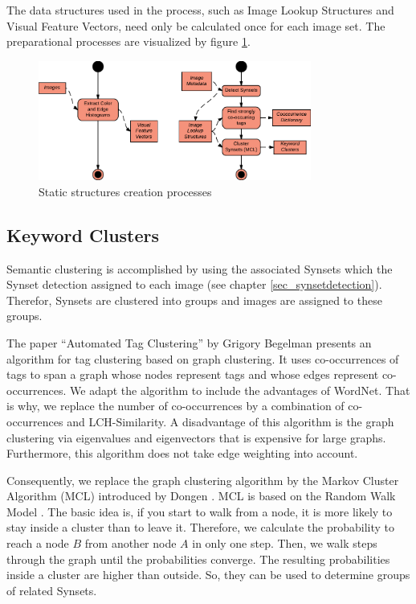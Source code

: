 The data structures used in the process, such as Image Lookup Structures and Visual Feature Vectors, need only be calculated once for each image set. The preparational processes are visualized by figure \ref{fig_precalcprocess}.

\begin{figure}[h]
\centering
\includegraphics[width=0.8\textwidth]{images/precalcs_activity_diagram.pdf}
\caption{Static structures creation processes}
\label{fig_precalcprocess}
\end{figure}


\subsection{Keyword Clusters}
\label{sec_keywordclustering}
Semantic clustering is accomplished by using the associated Synsets which the Synset detection assigned to each image (see chapter \ref{sec_synsetdetection}). Therefor, Synsets are clustered into groups and images are assigned to these groups.

\bigskip
The paper ``Automated Tag Clustering'' by Grigory Begelman \cite{begelman2006automated} presents an algorithm for tag clustering based on graph clustering. It uses co-occurrences of tags to span a graph whose nodes represent tags and whose edges represent co-occurrences. We adapt the algorithm to include the advantages of WordNet. That is why, we replace the number of co-occurrences by a combination of co-occurrences and LCH-Similarity.
A disadvantage of this algorithm is the graph clustering via eigenvalues and eigenvectors that is expensive for large graphs. Furthermore, this algorithm does not take edge weighting into account. 

Consequently, we replace the graph clustering algorithm by the Markov Cluster Algorithm (MCL) introduced by Dongen \cite{Dongen1998}. MCL is based on the Random Walk Model \cite{spitzer2001principles}. The basic idea is, if you start to walk from a node, it is more likely to stay inside a cluster than to leave it. Therefore, we calculate the probability to reach a node $B$ from another node $A$ in only one step. Then, we walk steps through the graph until the probabilities converge. The resulting probabilities inside a cluster are higher than outside. So, they can be used to determine groups of related Synsets.

